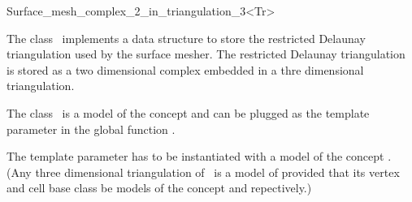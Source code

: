

\begin{ccRefClass}{Surface_mesh_complex_2_in_triangulation_3<Tr>}  %


\ccDefinition
  
The class \ccRefName\  implements a data structure to store
the restricted Delaunay triangulation used by the surface mesher.
The restricted Delaunay triangulation is stored as a two dimensional
complex embedded in a thre dimensional triangulation.


The class  \ccRefName\ is a model of the concept 
and can be plugged as the template parameter 
in the global function .


The template parameter  has to be instantiated
with a model of the concept .
(Any three dimensional   triangulation of
\cgal\ is a model of 
provided that its vertex and cell base class be models
of the concept  and
repectively.)





\ccIsModel











\end{ccRefClass}
